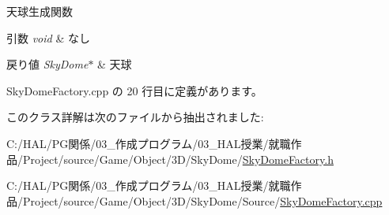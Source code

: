 天球生成関数 


\begin{DoxyParams}{引数}
{\em void} & なし \\
\hline
\end{DoxyParams}

\begin{DoxyRetVals}{戻り値}
{\em Sky\+Dome$\ast$} & 天球 \\
\hline
\end{DoxyRetVals}


 Sky\+Dome\+Factory.\+cpp の 20 行目に定義があります。



このクラス詳解は次のファイルから抽出されました\+:\begin{DoxyCompactItemize}
\item 
C\+:/\+H\+A\+L/\+P\+G関係/03\+\_\+作成プログラム/03\+\_\+\+H\+A\+L授業/就職作品/\+Project/source/\+Game/\+Object/3\+D/\+Sky\+Dome/\mbox{\hyperlink{_sky_dome_factory_8h}{Sky\+Dome\+Factory.\+h}}\item 
C\+:/\+H\+A\+L/\+P\+G関係/03\+\_\+作成プログラム/03\+\_\+\+H\+A\+L授業/就職作品/\+Project/source/\+Game/\+Object/3\+D/\+Sky\+Dome/\+Source/\mbox{\hyperlink{_sky_dome_factory_8cpp}{Sky\+Dome\+Factory.\+cpp}}\end{DoxyCompactItemize}
